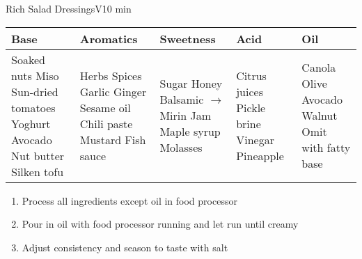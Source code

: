 \documentclass{article}
\newenvironment{card}[3][]
    {\begin{cardbase}[#1]{#2}{#3}\\}
    {\end{cardbase}}
\newenvironment{densecard}[3][]
    {\small
    \begin{card}[#1]{#2}{#3}}
    {\end{card}}
\newenvironment{steps}
    {\begin{enumerate}[leftmargin=*,topsep=0pt]}
    {\end{enumerate}}
\newcommand{\tag}[1]{\hspace{1em}#1}
\newcommand{\symboltag}[2]{\tag{#1\hspace{0.4em}#2}}
\newcommand{\totaltime}[1]{\symboltag{\raisebox{-0.1em}{\small\StopWatchEnd}}{#1}}
\begin{document}
\begin{densecard}{Rich Salad Dressings}{\tag{V}\totaltime{10 min}}
\begin{tabularx}{\textwidth}{@{}XXXXX@{}}
\toprule
Base & Aromatics & Sweetness & Acid & Oil \\
\midrule
Soaked nuts\newline
Miso\newline
Sun-dried tomatoes\newline
Yoghurt\newline
Avocado\newline
Nut butter\newline
Silken tofu
& %
Herbs\newline
Spices\newline
Garlic\newline
Ginger\newline
Sesame oil\newline
Chili paste\newline
Mustard\newline
Fish sauce
& %
Sugar\newline
Honey\newline
Balsamic $\rightarrow$\newline
Mirin\newline
Jam\newline
Maple syrup\newline
Molasses
& %
Citrus juices\newline
Pickle brine\newline
Vinegar\newline
Pineapple
& %
Canola\newline
Olive\newline
Avocado\newline
Walnut\newline
Omit with fatty base
\\
\bottomrule
\end{tabularx}
\begin{steps}
\item Process all ingredients except oil in food processor
\item Pour in oil with food processor running and let run until creamy
\item Adjust consistency and season to taste with salt
\end{steps}
\end{densecard}
\end{document}
